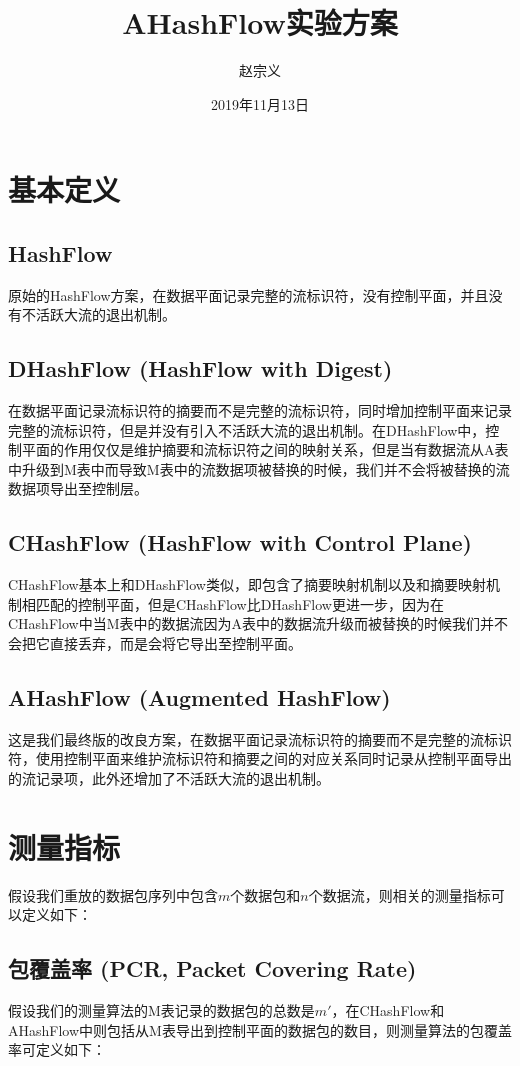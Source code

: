 \documentclass{article}
\title{AHashFlow实验方案}
\author{赵宗义}
\date{2019年11月13日}
\begin{document}
\maketitle

\tableofcontents

\section{基本定义}
\subsection{HashFlow}
原始的HashFlow方案，在数据平面记录完整的流标识符，没有控制平面，并且没有不活跃大流的退出机制。

\subsection{DHashFlow (HashFlow with Digest)}
在数据平面记录流标识符的摘要而不是完整的流标识符，同时增加控制平面来记录完整的流标识符，但是并没有引入不活跃大流的退出机制。在DHashFlow中，控制平面的作用仅仅是维护摘要和流标识符之间的映射关系，但是当有数据流从A表中升级到M表中而导致M表中的流数据项被替换的时候，我们并不会将被替换的流数据项导出至控制层。

\subsection{CHashFlow (HashFlow with Control Plane)}
CHashFlow基本上和DHashFlow类似，即包含了摘要映射机制以及和摘要映射机制相匹配的控制平面，但是CHashFlow比DHashFlow更进一步，因为在CHashFlow中当M表中的数据流因为A表中的数据流升级而被替换的时候我们并不会把它直接丢弃，而是会将它导出至控制平面。

\subsection{AHashFlow (Augmented HashFlow)}
这是我们最终版的改良方案，在数据平面记录流标识符的摘要而不是完整的流标识符，使用控制平面来维护流标识符和摘要之间的对应关系同时记录从控制平面导出的流记录项，此外还增加了不活跃大流的退出机制。

\section{测量指标}
假设我们重放的数据包序列中包含$m$个数据包和$n$个数据流，则相关的测量指标可以定义如下：

\subsection{包覆盖率 (PCR, Packet Covering Rate)}
假设我们的测量算法的M表记录的数据包的总数是$m'$，在CHashFlow和AHashFlow中则包括从M表导出到控制平面的数据包的数目，则测量算法的包覆盖率可定义如下：
\end{document}

